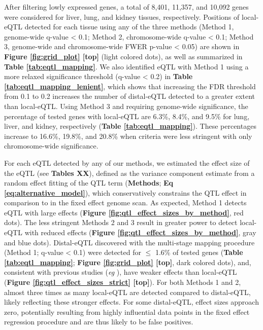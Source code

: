 After filtering lowly expressed genes, a total of 8,401, 11,357, and 10,092 genes were considered for liver, lung, and kidney tissues, respectively. Positions of local-eQTL detected for each tissue using any of the three methods (Method 1, genome-wide q-value < 0.1; Method 2, chromosome-wide q-value < 0.1; Method 3, genome-wide and chromosome-wide FWER p-value < 0.05)  are shown in \textbf{Figure \ref{fig:grid_plot} [top]} (light colored dots), as well as summarized in \textbf{Table \ref{tab:eqtl_mapping}}. We also identified eQTL with Method 1 using a more relaxed significance threshold (q-value < 0.2) in \textbf{Table \ref{tab:eqtl_mapping_lenient}}, which shows that increasing the FDR threshold from 0.1 to 0.2 increases the number of distal-eQTL detected to a greater extent than local-eQTL. Using Method 3 and requiring genome-wide significance, the percentage of tested genes with local-eQTL are 6.3\%, 8.4\%, and 9.5\% for lung, liver, and kidney, respectively (\textbf{Table \ref{tab:eqtl_mapping}}). These percentages increase to 16.6\%, 19.8\%, and 20.8\% when criteria were less stringent with only chromosome-wide significance. 

For each eQTL detected by any of our methods, we estimated the effect size of the eQTL (see \textbf{Tables XX}), defined as the variance component estimate from a random effect fitting of the QTL term (\textbf{Methods}; \textbf{Eq \ref{eq:alternative_model}}), which conservatively constrains the QTL effect in comparison to in the fixed effect genome scan. As expected, Method 1 detects eQTL with large effects (\textbf{Figure \ref{fig:qtl_effect_sizes_by_method}}, red dots). The less stringent Methods 2 and 3 result in greater power to detect local-eQTL with reduced effects (\textbf{Figure \ref{fig:qtl_effect_sizes_by_method}}, gray and blue dots). Distal-eQTL discovered with the multi-stage mapping procedure (Method 1; q-value < 0.1) were detected for $\leq$ 1.6\% of tested genes (\textbf{Table \ref{tab:eqtl_mapping}}; \textbf{Figure \ref{fig:grid_plot} [top]}, dark colored dots), and, consistent with previous studies (\textit{eg} \citealt{Chick2016}), have weaker effects than local-eQTL (\textbf{Figure \ref{fig:qtl_effect_sizes_strict} [top]}). For both Methods 1 and 2, almost three times as many local-eQTL are detected compared to distal-eQTL, likely reflecting these stronger effects. For some distal-eQTL, effect sizes approach zero, potentially resulting from highly influential data points in the fixed effect regression procedure and are thus likely to be false positives. 

